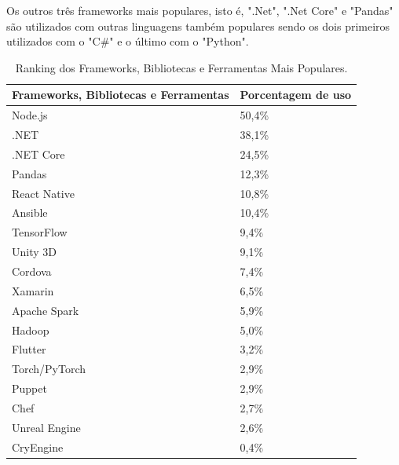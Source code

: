 Os outros três frameworks mais populares, isto é, ".Net", ".Net Core" e "Pandas" são utilizados com outras linguagens também populares sendo os dois primeiros utilizados com o "C\#" e o último com o "Python".

\begin{table}[htb]
\ABNTEXfontereduzida
\caption[Ranking dos Frameworks, Bibliotecas e Ferramentas Mais Populares]{Ranking dos Frameworks, Bibliotecas e Ferramentas Mais Populares.}
\label{tab-stack-overflow-framework-tools}
\begin{tabular}{p{5cm}|p{4cm}}
   \textbf{Frameworks, Bibliotecas e Ferramentas} & \textbf{Porcentagem de uso}  \\
    \hline
    Node.js & 50,4\%  \\
    \hline
    .NET & 38,1\%  \\
    \hline
    .NET Core & 24,5\%  \\
    \hline
    Pandas & 12,3\%  \\
    \hline
    React Native & 10,8\%  \\
    \hline
    Ansible & 10,4\%  \\
    \hline
    TensorFlow & 9,4\%  \\
    \hline
    Unity 3D & 9,1\%  \\
    \hline
    Cordova & 7,4\%  \\
    \hline
    Xamarin & 6,5\%  \\
    \hline
    Apache Spark & 5,9\%  \\
    \hline
    Hadoop & 5,0\%  \\
    \hline
    Flutter & 3,2\%  \\
    \hline
    Torch/PyTorch & 2,9\%  \\
    \hline
    Puppet & 2,9\%  \\
    \hline
    Chef & 2,7\%  \\
    \hline
    Unreal Engine & 2,6\%  \\
    \hline
    CryEngine & 0,4\%  \\
    
\end{tabular}
\end{table}

